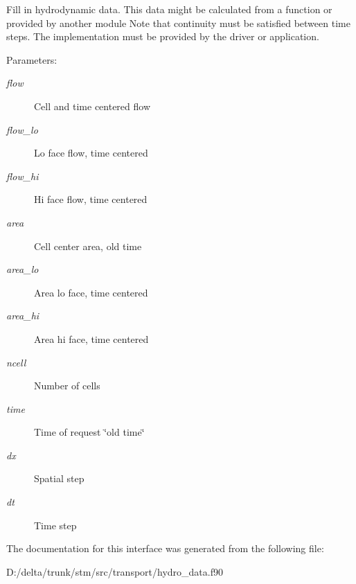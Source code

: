 Fill in hydrodynamic data. This data might be calculated from a function or provided by another module Note that continuity must be satisfied between time steps. The implementation must be provided by the driver or application. 

\begin{Desc}
\item[Parameters:]
\begin{description}
\item[{\em flow}]Cell and time centered flow\item[{\em flow\_\-lo}]Lo face flow, time centered\item[{\em flow\_\-hi}]Hi face flow, time centered\item[{\em area}]Cell center area, old time\item[{\em area\_\-lo}]Area lo face, time centered\item[{\em area\_\-hi}]Area hi face, time centered\item[{\em ncell}]Number of cells\item[{\em time}]Time of request \char`\"{}old time\char`\"{}\item[{\em dx}]Spatial step \item[{\em dt}]Time step \end{description}
\end{Desc}


The documentation for this interface was generated from the following file:\begin{CompactItemize}
\item 
D:/delta/trunk/stm/src/transport/hydro\_\-data.f90\end{CompactItemize}
